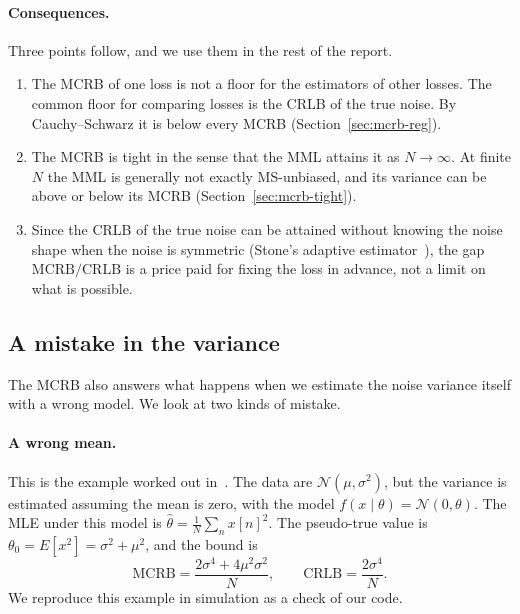 \documentclass[11pt]{article}
\numberwithin{figure}{section}
\numberwithin{equation}{section}
\begin{document}
\paragraph{Consequences.} Three points follow, and we use them in the rest of the report.
\begin{enumerate}
  \item The MCRB of one loss is not a floor for the estimators of other losses. The common floor for
        comparing losses is the CRLB of the true noise. By Cauchy--Schwarz it is below every MCRB
        (Section~\ref{sec:mcrb-reg}).
  \item The MCRB is tight in the sense that the MML attains it as $N \to \infty$. At finite $N$ the
        MML is generally not exactly MS-unbiased, and its variance can be above or below its MCRB
        (Section~\ref{sec:mcrb-tight}).
  \item Since the CRLB of the true noise can be attained without knowing the noise shape when the noise
        is symmetric (Stone's adaptive estimator~\cite{stone1975}), the gap $\text{MCRB}/\text{CRLB}$ is a
        price paid for fixing the loss in advance, not a limit on what is possible.
\end{enumerate}

\subsection{A mistake in the variance}

The MCRB also answers what happens when we estimate the noise variance itself with a wrong model.
We look at two kinds of mistake.

\paragraph{A wrong mean.} This is the example worked out in~\cite[Section~4.2]{fortunati}. The data are
$\mathcal{N}(\mu, \sigma^2)$, but the variance is estimated assuming the mean is zero, with the model
$f(x\mid\theta) = \mathcal{N}(0, \theta)$. The MLE under this model is $\hat\theta = \frac1N\sum_n x[n]^2$.
The pseudo-true value is $\theta_0 = E[x^2] = \sigma^2 + \mu^2$, and the bound is
\[
  \text{MCRB} = \frac{2\sigma^4 + 4\mu^2\sigma^2}{N}, \qquad \text{CRLB} = \frac{2\sigma^4}{N}.
\]
We reproduce this example in simulation as a check of our code.
\end{document}
